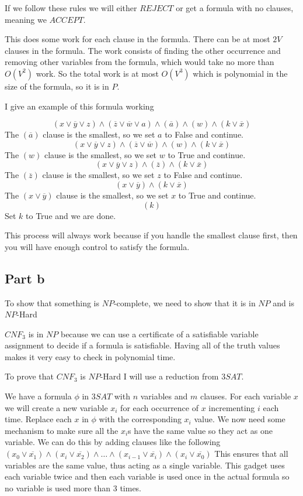 \documentclass[12pt]{article}
\begin{document}
If we follow these rules we will either $REJECT$ or get a formula with no clauses, meaning we $ACCEPT$.

This does some work for each clause in the formula. There can be at most $2V$ clauses in the formula. The work consists of finding the other occurrence and removing other variables from the formula, which would take no more than $O(V^2)$ work. So the total work is at most $O(V^3)$ which is polynomial in the size of the formula, so it is in $P$.

I give an example of this formula working

$$ (x \lor \overline{y} \lor z) \land (\overline{z} \lor \overline{w}\lor a ) \land (\overline{a}) \land (w) \land (k \lor \overline{x}) $$
The $(\overline{a})$ clause is the smallest, so we set $a$ to False and continue.
$$ (x \lor \overline{y} \lor z) \land (\overline{z} \lor \overline{w}) \land (w) \land (k \lor \overline{x}) $$
The $(w)$ clause is the smallest, so we set $w$ to True and continue.
$$ (x \lor \overline{y} \lor z) \land (\overline{z})  \land (k \lor \overline{x}) $$
The $(\overline{z})$ clause is the smallest, so we set $z$ to False and continue.
$$ (x \lor \overline{y}) \land (k \lor \overline{x}) $$
The $(x \lor \overline{y})$ clause is the smallest, so we set $x$ to True and continue.
$$ (k) $$
Set $k$ to True and we are done.


This process will always work because if you handle the smallest clause first, then you will have enough control to satisfy the formula.



\subsection*{Part b}

To show that something is $NP$-complete, we need to show that it is in $NP$ and is $NP$-Hard

$CNF_3$ is in $NP$ because we can use a certificate of a satisfiable variable assignment to decide if a formula is satisfiable. Having all of the truth values makes it very easy to check in polynomial time.

To prove that $CNF_3$ is $NP$-Hard I will use a reduction from $3SAT$.

We have a formula $\phi$ in $3SAT$ with $n$ variables and $m$ clauses. For each variable $x$ we will create a new variable $x_i$ for each occurrence of $x$ incrementing $i$ each time. Replace each $x$ in $\phi$ with the corresponding $x_i$ value. We now need some mechanism to make sure all the $x_i$s have the same value so they act as one variable. We can do this by adding clauses like the following $ (x_0 \lor \overline{x_1}) \land (x_i \lor \overline{x_2}) \land \dots \land (x_{i-1} \lor \overline{x_i}) \land (x_i \lor \overline{x_{0}})$ This ensures that all variables are the same value, thus acting as a single variable. This gadget uses each variable twice and then each variable is used once in the actual formula so no variable is used more than 3 times.
\end{document}
